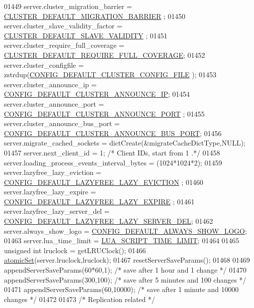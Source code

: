 \begin{DoxyCode}
{{{{{{{{{{{{{{{01449     server.cluster\_migration\_barrier = \hyperlink{cluster_8h_a1895138f4125c5dce77e8fe28c9bd8d1}{CLUSTER\_DEFAULT\_MIGRATION\_BARRIER}
      ;
01450     server.cluster\_slave\_validity\_factor = \hyperlink{cluster_8h_a44b183827017eca27648d5991fc50b13}{CLUSTER\_DEFAULT\_SLAVE\_VALIDITY}
      ;
01451     server.cluster\_require\_full\_coverage = 
      \hyperlink{cluster_8h_aa27e3466414a1464e6f2721b8872827d}{CLUSTER\_DEFAULT\_REQUIRE\_FULL\_COVERAGE};
01452     server.cluster\_configfile = zstrdup(\hyperlink{server_8h_a5b0c46fd63529819e2c0189003d72122}{CONFIG\_DEFAULT\_CLUSTER\_CONFIG\_FILE}
      );
01453     server.cluster\_announce\_ip = \hyperlink{server_8h_a0b8729bdfd537311480f4c3bb3a20905}{CONFIG\_DEFAULT\_CLUSTER\_ANNOUNCE\_IP};
01454     server.cluster\_announce\_port = \hyperlink{server_8h_ac55c8423c202c1f0b4e786eb70adefb3}{CONFIG\_DEFAULT\_CLUSTER\_ANNOUNCE\_PORT}
      ;
01455     server.cluster\_announce\_bus\_port = 
      \hyperlink{server_8h_a86d6a82bc81e718079728c3cb6c8c5b4}{CONFIG\_DEFAULT\_CLUSTER\_ANNOUNCE\_BUS\_PORT};
01456     server.migrate\_cached\_sockets = dictCreate(&migrateCacheDictType,NULL);
01457     server.next\_client\_id = 1; \textcolor{comment}{/* Client IDs, start from 1 .*/}
01458     server.loading\_process\_events\_interval\_bytes = (1024*1024*2);
01459     server.lazyfree\_lazy\_eviction = \hyperlink{server_8h_aa6529c6ba7143b1ec4aa15d8a96b2154}{CONFIG\_DEFAULT\_LAZYFREE\_LAZY\_EVICTION}
      ;
01460     server.lazyfree\_lazy\_expire = \hyperlink{server_8h_a2e6080731ab6e81b19f1bfedf7b298f9}{CONFIG\_DEFAULT\_LAZYFREE\_LAZY\_EXPIRE}
      ;
01461     server.lazyfree\_lazy\_server\_del = 
      \hyperlink{server_8h_ac1f765315b576de4c0ea2beb7e37ae02}{CONFIG\_DEFAULT\_LAZYFREE\_LAZY\_SERVER\_DEL};
01462     server.always\_show\_logo = \hyperlink{server_8h_a0f350070473d6d89bcd365ea4ff361cb}{CONFIG\_DEFAULT\_ALWAYS\_SHOW\_LOGO};
01463     server.lua\_time\_limit = \hyperlink{server_8h_ab72fac70fbc902a7f106f4c710e08271}{LUA\_SCRIPT\_TIME\_LIMIT};
01464 
01465     \textcolor{keywordtype}{unsigned} \textcolor{keywordtype}{int} lruclock = getLRUClock();
01466     \hyperlink{atomicvar_8h_a0f02b5846dcf4ed3669ecf771c512d12}{atomicSet}(server.lruclock,lruclock);
01467     resetServerSaveParams();
01468 
01469     appendServerSaveParams(60*60,1);  \textcolor{comment}{/* save after 1 hour and 1 change */}
01470     appendServerSaveParams(300,100);  \textcolor{comment}{/* save after 5 minutes and 100 changes */}
01471     appendServerSaveParams(60,10000); \textcolor{comment}{/* save after 1 minute and 10000 changes */}
01472 
01473     \textcolor{comment}{/* Replication related */}
}}}}}}}}}}}}}}}
\end{DoxyCode}
